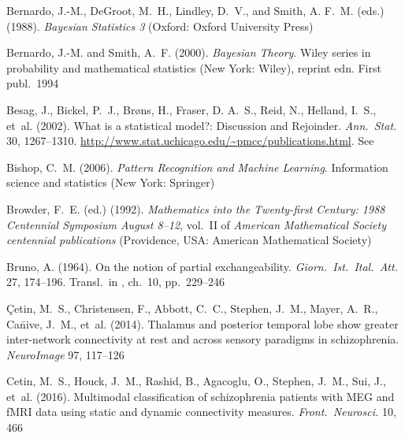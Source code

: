 \documentclass[%
]{frontiersSCNS-nologo} %
\newcommand*{\langitalian}{\foreignlanguage{italian}}
\newcommand*{\citebi}[2][]{\citet[#1]{#2}%
}
\newcommand*{\chap}{ch.} %
\renewcommand*{\|}{\mathpunct{|}}%
\begin{document}
\begin{thebibliography}{156}
Bernardo, J.-M., DeGroot, M.~H., Lindley, D.~V., and Smith, A. F.~M. (eds.)
  (1988).
\newblock \emph{Bayesian Statistics 3} (Oxford: Oxford University Press)

Bernardo, J.-M. and Smith, A.~F. (2000).
\newblock \emph{Bayesian Theory}.
\newblock Wiley series in probability and mathematical statistics (New York:
  Wiley), reprint edn.
\newblock First publ.\ 1994

Besag, J., Bickel, P.~J., Br{\o}ns, H., Fraser, D. A.~S., Reid, N., Helland,
  I.~S., et~al. (2002).
\newblock What is a statistical model?: {Discussion} and {Rejoinder}.
\newblock \emph{Ann.\ Stat.} 30, 1267--1310.
\newblock \url{http://www.stat.uchicago.edu/~pmcc/publications.html}. See
  \citebi{mccullagh2002}

Bishop, C.~M. (2006).
\newblock \emph{Pattern Recognition and Machine Learning}.
\newblock Information science and statistics (New York: Springer)

Browder, F.~E. (ed.) (1992).
\newblock \emph{Mathematics into the Twenty-first Century: 1988 Centennial
  Symposium August 8--12}, vol.~II of \emph{American Mathematical Society
  centennial publications} (Providence, USA: American Mathematical Society)

Bruno, A. (1964).
\newblock On the notion of partial exchangeability.
\newblock \emph{\langitalian{Giorn.\ Ist.\ Ital.\ Att.}} 27, 174--196.
\newblock Transl.\ in \citebi{definetti1972}, \chap~10, pp.~229--246

\c{C}etin, M.~S., Christensen, F., Abbott, C.~C., Stephen, J.~M., Mayer, A.~R.,
  Ca\={n}ive, J.~M., et~al. (2014).
\newblock Thalamus and posterior temporal lobe show greater inter-network
  connectivity at rest and across sensory paradigms in schizophrenia.
\newblock \emph{NeuroImage} 97, 117--126

Cetin, M.~S., Houck, J.~M., Rashid, B., Agacoglu, O., Stephen, J.~M., Sui, J.,
  et~al. (2016).
\newblock Multimodal classification of schizophrenia patients with {MEG} and
  {fMRI} data using static and dynamic connectivity measures.
\newblock \emph{Front.\ Neurosci.} 10, 466


\end{thebibliography}
\end{document}
